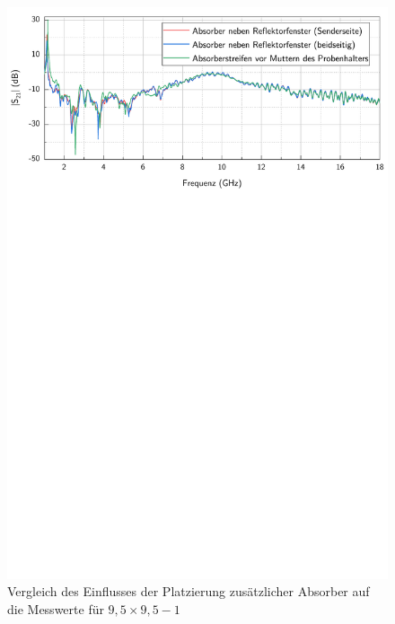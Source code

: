 \begin{figure}[ht]
    \centering
    \includegraphics[page = 1, width = .99\textwidth, trim = 0cm 16.8cm 0cm 0cm, clip]{Abbildungen/Kapitel4/Messergebnisse/9k5x9k5-1.pdf}
    \caption[Vergleich des Einflusses der Platzierung zusätzlicher Absorber auf die Messwerte]{Vergleich des Einflusses der Platzierung zusätzlicher Absorber auf die Messwerte für \mbox{$9,5\times9,5-1$}}
    \label{fig:4_9k5x9k5-1_Absorberplatzierung}
\end{figure}

